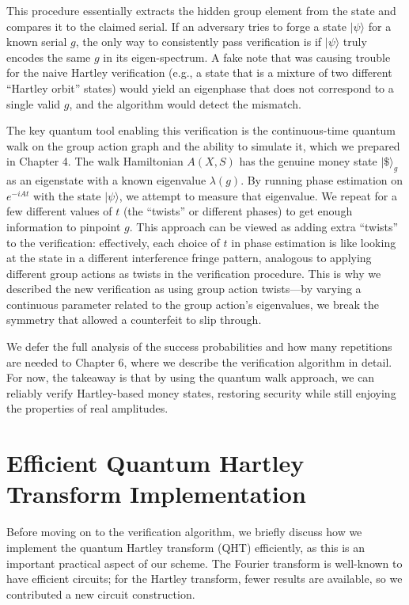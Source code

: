 \documentclass[11pt]{article}
\theoremstyle{definition}
\begin{document}
This procedure essentially extracts the hidden group element from the state and compares it to the claimed serial. If an adversary tries to forge a state $|\psi\rangle$ for a known serial $g$, the only way to consistently pass verification is if $|\psi\rangle$ truly encodes the same $g$ in its eigen-spectrum. A fake note that was causing trouble for the naive Hartley verification (e.g., a state that is a mixture of two different “Hartley orbit” states) would yield an eigenphase that does not correspond to a single valid $g$, and the algorithm would detect the mismatch.

The key quantum tool enabling this verification is the continuous-time quantum walk on the group action graph and the ability to simulate it, which we prepared in Chapter 4. The walk Hamiltonian $A(X,S)$ has the genuine money state $|\$\rangle_g$ as an eigenstate with a known eigenvalue $\lambda(g)$. By running phase estimation on $e^{-iA t}$ with the state $|\psi\rangle$, we attempt to measure that eigenvalue. We repeat for a few different values of $t$ (the “twists” or different phases) to get enough information to pinpoint $g$. This approach can be viewed as adding extra “twists” to the verification: effectively, each choice of $t$ in phase estimation is like looking at the state in a different interference fringe pattern, analogous to applying different group actions as twists in the verification procedure. This is why we described the new verification as using group action twists—by varying a continuous parameter related to the group action’s eigenvalues, we break the symmetry that allowed a counterfeit to slip through.

We defer the full analysis of the success probabilities and how many repetitions are needed to Chapter 6, where we describe the verification algorithm in detail. For now, the takeaway is that by using the quantum walk approach, we can reliably verify Hartley-based money states, restoring security while still enjoying the properties of real amplitudes.

\section{Efficient Quantum Hartley Transform Implementation}
Before moving on to the verification algorithm, we briefly discuss how we implement the quantum Hartley transform (QHT) efficiently, as this is an important practical aspect of our scheme. The Fourier transform is well-known to have efficient circuits; for the Hartley transform, fewer results are available, so we contributed a new circuit construction.
\end{document}
